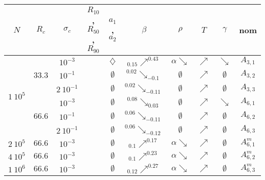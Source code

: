 \begin{table}[htbp]
	\centering
		\begin{tabular}{|c|c|c|c|c|c|c|c|c|c|}
			\hline $N$ & $R_c$ & $\sigma_c$ & $R_{10}$, $R_{50}$, $R_{90}$ & $a_1$, $a_2$ & $\beta$ & $\rho$ & $T$ & $\gamma$ & nom \tabularnewline
			\hline
			\hline \multirow{6}{*}{$1\ 10^5$} & \multirow{3}{*}{$33.3$}
					& $10^{-3}$ & \accretionmoyen{} & $\diamondsuit$ & ${}_{0.15}\nearrow^{0.43}$ & $\alpha\searrow$ & $\nearrow$ & $\searrow$ & $A_{3,1}$ \tabularnewline \cline{3-10}
					& & $10^{-1}$ & \accretionpeu{} & $\emptyset$ & ${}^{0.02}\searrow_{-0.1}$ & $\emptyset$ & $\nearrow$ & $\emptyset$ & $A_{3,2}$  \tabularnewline \cline{3-10}
					& & $2\ 10^{-1}$ & \accretionpeu{} & $\emptyset$ & ${}^{0.02}\searrow_{-0.11}$ & $\emptyset$ & $\nearrow$ & $\emptyset$ & $A_{3,3}$  \tabularnewline \cline{2-10}
				& \multirow{3}{*}{$66.6$}
					& $10^{-3}$ & \accretionpeu{} & $\emptyset$ & ${}^{0.08}\searrow_{0.03}$ & $\emptyset$ & $\nearrow$ & $\searrow$ & $A_{6,1}$  \tabularnewline \cline{3-10}
					& & $10^{-1}$ & \accretionpeu{} & $\emptyset$ & ${}^{0.06}\searrow_{-0.11}$ & $\emptyset$ & $\nearrow$ & $\emptyset$ & $A_{6,2}$  \tabularnewline \cline{3-10}
					& & $2\ 10^{-1}$ & \accretionpeu{} & $\emptyset$ & ${}^{0.06}\searrow_{-0.12}$ & $\emptyset$ & $\nearrow$ & $\emptyset$ & $A_{6,3}$  \tabularnewline \cline{2-10}
			\hline
			\hline $2\ 10^5$ & $66.6$ & $10^{-3}$ & \accretionpeu{} & $\emptyset$ & ${}_{0.1}\nearrow^{0.17}$ & $\alpha\searrow$ & $\nearrow$ & $\emptyset$ & $A_{6,1}^m$  \\
			\hline
			\hline $4\ 10^5$ & $66.6$ & $10^{-3}$ & \accretionpeu{} & $\emptyset$ & ${}_{0.1}\nearrow^{0.23}$ & $\alpha\searrow$ & $\nearrow$ & $\emptyset$ & $A_{6,2}^m$  \\
			\hline
			\hline $1\ 10^6$ & $66.6$ & $10^{-3}$ & \accretionpeu{} & $\emptyset$ & ${}_{0.12}\nearrow^{0.27}$ & $\alpha\searrow$ & $\nearrow$ & $\emptyset$ & $A_{6,3}^m$  \\

\end{tabular}
\end{table}
